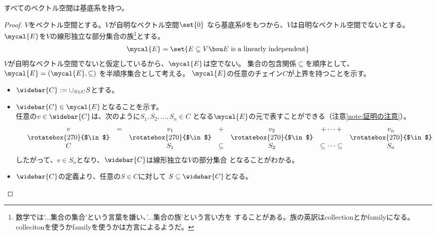 	\begin{proposition}[ベクトル空間の基底系]
	\label{prop:ベクトル空間の基底系} %
		すべてのベクトル空間は基底系を持つ。
	\end{proposition} %
	\begin{proof} $V$をベクトル空間とする。$V$が自明なベクトル空間$\set{0}$
	なら基底系$\emptyset$をもつから、$V$は自明なベクトル空間でないとする。
	$\mycal{E}$を$V$の線形独立な部分集合の族\footnote{
		数学では'...集合の集合'という言葉を嫌い、'...集合の族'という言い方を
		することがある。族の英訳はcollectionとかfamilyになる。
		collecitonを使うかfamilyを使うかは方言によるようだ。
	}とする。
	\begin{equation*}\begin{split}
		\mycal{E} = \set{E\subseteq V\bou E \text{ is a linearly independent}}
	\end{split}\end{equation*}
	$V$が自明なベクトル空間でないと仮定しているから、$\mycal{E}$は空でない。
	集合の包含関係$\subseteq$を順序として、$\mycal{E}=(\mycal{E},\subseteq)$
	を半順序集合として考える。
	$\mycal{E}$の任意のチェイン$C$が上界を持つことを示す。
	\begin{itemize}\setlength{\itemsep}{-1mm} %
		\item $\widebar{C}:=\cup_{S\in C}S$とする。
		\item $\widebar{C}\in\mycal{E}$となることを示す。 \\
		任意の$v\in\widebar{C}$は、次のように$S_1,S_2,\dots,S_n\in C$
		となる$\mycal{E}$の元で表すことができる（注意\ref{note:証明の注意}）。
		\begin{equation*}\begin{split}
			\begin{array}{ccccccccc}
				&v& = &v_1& + &v_2& + \cdots + &v_n& \\
				&\rotatebox{270}{$\in$}& &\rotatebox{270}{$\in$}& 
					&\rotatebox{270}{$\in$}& &\rotatebox{270}{$\in$}& \\
				&C&  &S_1& \subseteq &S_2& \subseteq \cdots \subseteq &S_n& \\
			\end{array}
		\end{split}\end{equation*}
		したがって、$v\in S_n$となり、$\widebar{C}$は線形独立な$V$の部分集合
		となることがわかる。
		\item $\widebar{C}$の定義より、任意の$S\in C$に対して
		$S\subseteq\widebar{C}$となる。
	\end{itemize} %

\end{proof}
